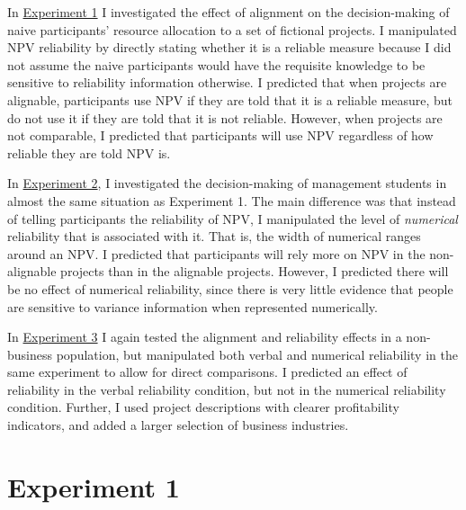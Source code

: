 \documentclass[a4paper, nobind, dvipsnames]{templates/ociamthesis}
\theoremstyle{definition}
\theoremstyle{definition}
\theoremstyle{definition}
\theoremstyle{definition}
\theoremstyle{remark}
\begin{document}
In \protect\hyperlink{alignment-2}{Experiment 1} I investigated the effect of alignment on the
decision-making of naive participants' resource allocation to a set of fictional
projects. I manipulated NPV reliability by directly stating whether it is a
reliable measure because I did not assume the naive participants would have the
requisite knowledge to be sensitive to reliability information otherwise. I
predicted that when projects are alignable, participants use NPV if they are
told that it is a reliable measure, but do not use it if they are told that it
is not reliable. However, when projects are not comparable, I predicted that
participants will use NPV regardless of how reliable they are told NPV is.

In \protect\hyperlink{alignment-3}{Experiment 2}, I investigated the decision-making of
management students in almost the same situation as Experiment 1. The main
difference was that instead of telling participants the reliability of NPV, I
manipulated the level of \emph{numerical} reliability that is associated with it.
That is, the width of numerical ranges around an NPV. I predicted that
participants will rely more on NPV in the non-alignable projects than in the
alignable projects. However, I predicted there will be no effect of numerical
reliability, since there is very little evidence that people are sensitive to
variance information when represented numerically.

In \protect\hyperlink{alignment-8}{Experiment 3} I again tested the alignment and reliability
effects in a non-business population, but manipulated both verbal and numerical
reliability in the same experiment to allow for direct comparisons. I predicted
an effect of reliability in the verbal reliability condition, but not in the
numerical reliability condition. Further, I used project descriptions with
clearer profitability indicators, and added a larger selection of business
industries.

\hypertarget{alignment-2}{%
\section{Experiment 1}\label{alignment-2}}
\end{document}
